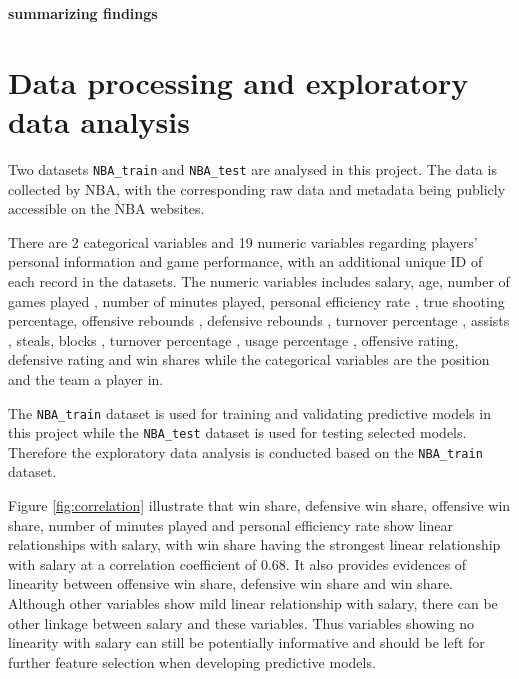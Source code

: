 \documentclass[letterpaper,12pt,twoside,]{pinp}
\begin{document}
\textbf{summarizing findings}

\hypertarget{data-processing-and-exploratory-data-analysis}{%
\section{Data processing and exploratory data
analysis}\label{data-processing-and-exploratory-data-analysis}}

Two datasets \texttt{NBA\_train} and \texttt{NBA\_test} are analysed in
this project. The data is collected by NBA, with the corresponding raw
data and metadata being publicly accessible on the NBA websites.

There are 2 categorical variables and 19 numeric variables regarding
players' personal information and game performance, with an additional
unique ID of each record in the datasets. The numeric variables includes
salary, age, number of games played , number of minutes played, personal
efficiency rate , true shooting percentage, offensive rebounds ,
defensive rebounds , turnover percentage , assists , steals, blocks ,
turnover percentage , usage percentage , offensive rating, defensive
rating and win shares while the categorical variables are the position
and the team a player in.

The \texttt{NBA\_train} dataset is used for training and validating
predictive models in this project while the \texttt{NBA\_test} dataset
is used for testing selected models. Therefore the exploratory data
analysis is conducted based on the \texttt{NBA\_train} dataset.

Figure \ref{fig:correlation} illustrate that win share, defensive win
share, offensive win share, number of minutes played and personal
efficiency rate show linear relationships with salary, with win share
having the strongest linear relationship with salary at a correlation
coefficient of 0.68. It also provides evidences of linearity between
offensive win share, defensive win share and win share. Although other
variables show mild linear relationship with salary, there can be other
linkage between salary and these variables. Thus variables showing no
linearity with salary can still be potentially informative and should be
left for further feature selection when developing predictive models.
\end{document}
